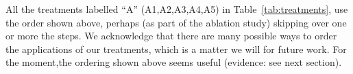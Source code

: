 All the treatments labelled ``A'' (A1,A2,A3,A4,A5)  in Table~\ref{tab:treatments},  use the order shown above, perhaps
(as part of the ablation study) skipping over one or more the steps. 
We acknowledge that there are many possible ways to order the applications of our treatments, which is a matter we will for future work. For the moment,the ordering shown above seems useful (evidence: see next section).



\newcommand{\best}{\cellcolor{lightgray}}
\newcommand{\bad}{\cellcolor{pink}}

